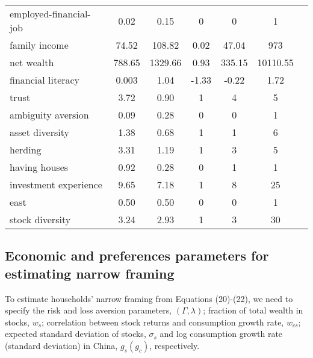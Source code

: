 \documentclass[ukenglish,nottitlepage,thmsb,11pt,letterpaper]{article}
\begin{document}
\begin{spacing}{1}
\begin{table}[H]
\begin{tabular*}{\textwidth}{l @{\extracolsep{\fill}} cccccc}
 			employed-financial-job  &0.02   &0.15   &0  &0   &1    \\
 			family income  &74.52  &108.82  &0.02  &47.04  &973 \\
 			net wealth        &788.65 &1329.66 &0.93  &335.15 &10110.55 \\
 			financial literacy      &0.003 &1.04 &-1.33 &-0.22 &1.72  \\
 			trust                   &3.72 &0.90 &1       &4      &5        \\
 			ambiguity aversion      &0.09 &0.28 &0       &0      &1       \\
 			asset diversity         &1.38 &0.68 &1       &1      &6       \\
 			herding                 &3.31 &1.19 &1       &3      &5      \\
 			having houses           &0.92 &0.28 &0       &1      &1      \\
 			investment experience   &9.65   &7.18   &1   &8   &25        \\
 			east                    &0.50   &0.50   &0   &0  &1           \\
 			stock diversity         &3.24   &2.93   &1   &3  &30   \\
 			\bottomrule
 		\end{tabular*}%
 	\end{table}%
 \end{spacing}
\subsection{Economic and preferences parameters for estimating narrow framing}

To estimate households' narrow framing from Equations (20)-(22), we need to specify the risk and loss aversion  parameters, $(\Gamma, \lambda)$; fraction of total wealth in stocks, $w_s$; correlation between stock returns and consumption growth rate, $w_{cs}$; expected standard deviation of stocks, $\sigma_s$ and log consumption growth rate (standard deviation) in China, $g_s (g_c)$, respectively.  
\end{document}

